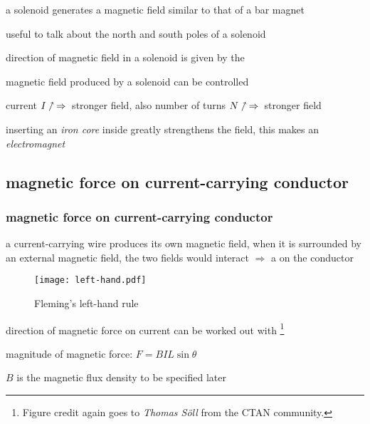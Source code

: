 \cmt a solenoid generates a magnetic field similar to that of a bar magnet

useful to talk about the north and south poles of a solenoid

\cmt direction of magnetic field in a solenoid is given by the 


\cmt magnetic field produced by a solenoid can be controlled

current $I\nnearrow \, \Rightarrow \, $ stronger field, also number of turns $N\nnearrow\, \Rightarrow \, $ stronger field

\cmt inserting an \emph{iron core} inside greatly strengthens the field, this makes an \emph{electromagnet}



\subsection{magnetic force on current-carrying conductor}

\subsubsection{magnetic force on current-carrying conductor}

a current-carrying wire produces its own magnetic field, when it is surrounded by an external magnetic field, the two fields would interact $\Rightarrow$ a  on the conductor

\begin{wrapfigure}{r}{0.4\textwidth}
	\vspace*{-16pt}
	\centering
	\texttt{[image: left-hand.pdf]}
	
	Fleming's left-hand rule
	\vspace*{-16pt}
\end{wrapfigure}

\cmt direction of magnetic force on current can be worked out with \footnote{Figure credit again goes to \emph{Thomas S\"{o}ll} from the CTAN community.}

\cmt magnitude of magnetic force: $\boxed{F=BIL\sin\theta}$

$B$ is the magnetic flux density to be specified later

